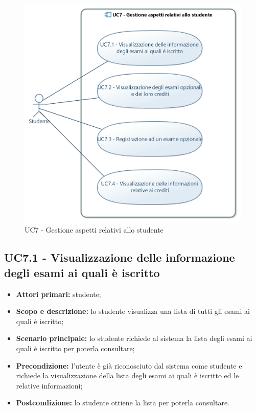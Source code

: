 \documentclass[AnalisiDeiRequisiti.tex]{subfiles}
\begin{document}
\begin{figure}[H]
	\centering
	\includegraphics[width=0.8\linewidth]{UC7.jpg}
	\caption{UC7 - Gestione aspetti relativi allo studente}
	\label{fig:UC7 - Gestione aspetti relativi allo studente}
\end{figure}


\subsection{UC7.1 - Visualizzazione delle informazione degli esami ai quali è iscritto}
\begin{itemize}
	\item \textbf{Attori primari:} studente;
	\item \textbf{Scopo e descrizione:} lo studente visualizza una lista di tutti gli esami ai quali è iscritto;
	\item \textbf{Scenario principale:} lo studente richiede al sistema la lista degli esami ai quali è iscritto per poterla consultare;
	\item \textbf{Precondizione:} l'utente è già riconosciuto dal sistema come studente e richiede la visualizzazione della lista degli esami ai quali è iscritto ed le relative informazioni;
	\item \textbf{Postcondizione:} lo studente ottiene la lista per poterla consultare.
\end{itemize}
\end{document}
